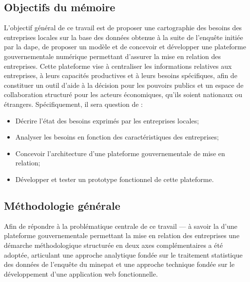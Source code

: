 \documentclass[12pt, a4paper, oneside]{report}
\begin{document}
	\subsection{Objectifs du mémoire}
	L’objectif général de ce travail est de proposer une cartographie des besoins des entreprises locales sur la base des données obtenue à la suite de l’enquête initiée par la \gls{dape}, de proposer un modèle  et de concevoir et développer une plateforme gouvernementale numérique permettant d’assurer la mise en relation des entreprises. Cette plateforme vise à centraliser les informations relatives aux entreprises, à leurs capacités productives et à leurs besoins spécifiques, afin de constituer un outil d’aide à la décision pour les pouvoirs publics et un espace de collaboration structuré pour les acteurs économiques, qu’ils soient nationaux ou étrangers. Spécifiquement, il sera question de :
	\begin{itemize}
		\item Décrire l’état des besoins exprimés par les entreprises locales;
		\item Analyser les besoins en fonction des caractéristiques des entreprises;
		\item Concevoir l’architecture d’une plateforme gouvernementale de mise en relation;
		\item  Développer et tester un prototype fonctionnel de cette plateforme.
	\end{itemize}

	\subsection{Méthodologie générale}
	\label{sec:methodologie_generale}
	
	Afin de répondre à la problématique centrale de ce travail ---
	à savoir la d'une plateforme gouvernementale permettant
	la mise en relation des entreprises une
	démarche méthodologique structurée en deux axes complémentaires
	a été adoptée, articulant une approche analytique fondée sur le
	traitement statistique des données de l'enquête du \gls{minepat}
	et une approche technique fondée sur le développement d'une
	application web fonctionnelle.
\end{document}
